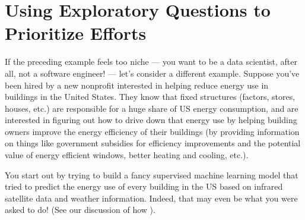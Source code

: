 \documentclass[letterpaper,10pt,english]{jupyterBook}
\begin{document}
\section{Using Exploratory Questions to Prioritize Efforts}
\label{\detokenize{30_questions/10_using_exploratory_questions:using-exploratory-questions-to-prioritize-efforts}}
\sphinxAtStartPar
If the preceding example feels too niche — you want to be a data scientist, after all, not a software engineer! — let’s consider a different example. Suppose you’ve been hired by a new non\sphinxhyphen{}profit interested in helping reduce energy use in buildings in the United States. They know that fixed structures (factors, stores, houses, etc.) are responsible for a huge share of US energy consumption, and are interested in figuring out how to drive down that energy use by helping building owners improve the energy efficiency of their buildings (by providing information on things like government subsidies for efficiency improvements and the potential value of energy efficient windows, better heating and cooling, etc.).

\sphinxAtStartPar
You  start out by trying to build a fancy supervised machine learning model that tried to predict the energy use of every building in the US based on infrared satellite data and weather information. Indeed, that may even be what you were asked to do! (See our discussion of how {\hyperref[\detokenize{30_questions/10_using_exploratory_questions:../20_problems_to_questions/30_solving_the_right_problem}]{}}).
\end{document}
